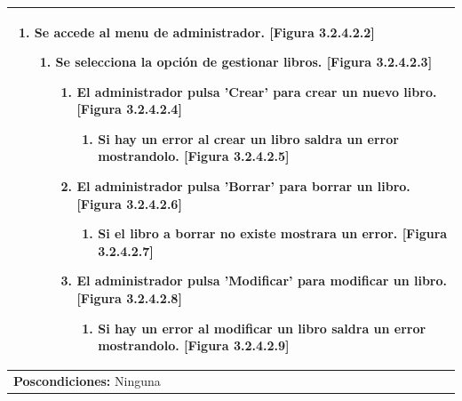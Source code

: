 \documentclass{report}
\begin{document}
\begin{center}
\begin{longtable}{|p{\linewidth}|}
                            \begin{enumerate}
                                \item Se accede al menu de administrador. [Figura 3.2.4.2.2]
                                \begin{enumerate}
                                    \item Se selecciona la opción de gestionar libros. [Figura 3.2.4.2.3]
                                    \begin{enumerate}
                                        \item El administrador pulsa 'Crear' para crear un nuevo libro. [Figura 3.2.4.2.4]
                                        \begin{enumerate}
                                            \item Si hay un error al crear un libro saldra un error mostrandolo. [Figura 3.2.4.2.5]
                                        \end{enumerate}
                                        \item El administrador pulsa 'Borrar' para borrar un libro. [Figura 3.2.4.2.6]
                                        \begin{enumerate}
                                            \item Si el libro a borrar no existe mostrara un error. [Figura 3.2.4.2.7]
                                        \end{enumerate}
                                        \item El administrador pulsa 'Modificar' para modificar un libro. [Figura 3.2.4.2.8]
                                        \begin{enumerate}
                                            \item Si hay un error al modificar un libro saldra un error mostrandolo. [Figura 3.2.4.2.9]
                                        \end{enumerate}
                                    \end{enumerate}
                                \end{enumerate} 
                            \end{enumerate}\\
                            \hline
                            \textbf{Poscondiciones:} Ninguna\\
                            \hline

\end{longtable}
\end{center}
\end{document}
